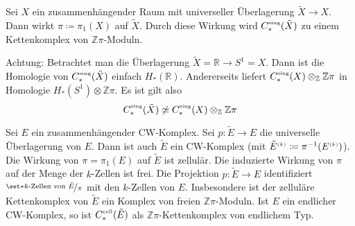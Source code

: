 \begin{bemerkung}
	Sei $X$ ein zusammenhängender Raum mit universeller Überlagerung $\tilde{X} \to X$.
	Dann wirkt $\pi \coloneqq \pi_1(X)$ auf $\tilde{X}$.
	Durch diese Wirkung wird $C^\sing_*(\tilde{X})$ zu einem Kettenkomplex von $\mathbb{Z}\pi$-Moduln.
\end{bemerkung}

\begin{bemerkung}
	Achtung: Betrachtet man die Überlagerung $\tilde{X}=\mathbb{R} \to S^1 = X$.
	Dann ist die Homologie von $C_*^\sing(\tilde{X})$ einfach $H_*(\mathbb{R})$. Andererseits liefert $C_*^\sing(X) \otimes_\mathbb{Z} \mathbb{Z}\pi$ in Homologie
	$H_*(S^1) \otimes \mathbb{Z}\pi$.
	Es ist gilt also
	\[
		C_*^\sing(\tilde{X}) \not\simeq C_*^\sing(X) \otimes_\mathbb{Z} \mathbb{Z}\pi
	\]
\end{bemerkung}

\begin{bemerkung}
	Sei $E$ ein zusammenhängender CW-Komplex.
	Sei $p \colon \tilde{E} \to E$ die universelle Überlagerung von $E$.
	Dann ist auch $\tilde{E}$ ein CW-Komplex (mit $\tilde{E}^{\scriptscriptstyle(k)} \coloneqq \pi^{-1}(E^{\scriptscriptstyle(k)})$).
	Die Wirkung von $\pi = \pi_1(E)$ auf $\tilde{E}$ ist zellulär.
	Die induzierte Wirkung von $\pi$ auf der Menge der $k$-Zellen ist frei.
	Die Projektion $p \colon \tilde{E} \to E$ identifiziert 
	\(
		\nicefrac{\set*{\text{$k$-Zellen von } \tilde{E}}}{\pi}
	\)
	mit den $k$-Zellen von $E$.
	Insbesondere ist der zelluläre Kettenkomplex von $\tilde{E}$ ein Komplex von freien $\mathbb{Z}\pi$-Moduln.
	Ist $E$ ein endlicher CW-Komplex, so ist $C^{\cell}_*(\tilde{E})$ als $\mathbb{Z}\pi$-Kettenkomplex von endlichem Typ.
\end{bemerkung}

